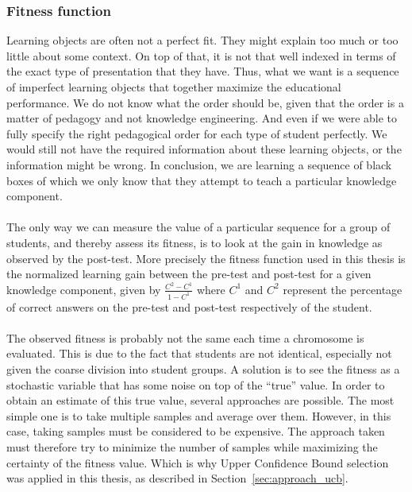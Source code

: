 \subsubsection{Fitness function}
Learning objects are often not a perfect fit. They might explain too much or too
little about some context. On top of that, it is not that well indexed in terms of the
exact type of presentation that they have. Thus, what we want is a
sequence of imperfect learning objects that together maximize the
educational performance. We do not know what the order should be, given
that the order is a matter of pedagogy and not knowledge engineering.
And even if we were able to fully specify the right pedagogical order
for each type of student perfectly. We would still not have the
required information about these learning objects, or the information
might be wrong. In conclusion, we are learning a sequence of black
boxes of which we only know that they attempt to teach a particular
knowledge component.\\\\
\noindent
The only way we can measure the value of a particular sequence for a
group of students, and thereby assess its fitness, is to look at the
gain in knowledge as observed by the post-test. More precisely the fitness
function used in this thesis is the normalized learning gain between the
pre-test and post-test for a given knowledge component, given by $\frac{C^2 -
C^1}{1-C^1}$ where $C^1$ and $C^2$ represent the percentage of correct answers
on the pre-test and post-test respectively of the student.\\\\
\noindent
The observed fitness is probably not the same each time a chromosome
is evaluated. This is due to the fact that students are not identical,
especially not given the coarse division into student groups. A solution
is to see the fitness as a stochastic variable that has some noise on
top of the ``true'' value. In order to obtain an estimate of this true
value, several approaches are possible. The most simple one is to take
multiple samples and average over them. However, in this case, taking
samples must be considered to be expensive. The approach taken must
therefore try to minimize the number of samples while maximizing the
certainty of the fitness value. Which is why Upper Confidence Bound selection
was applied in this thesis, as described in Section~\ref{sec:approach_ucb}.

